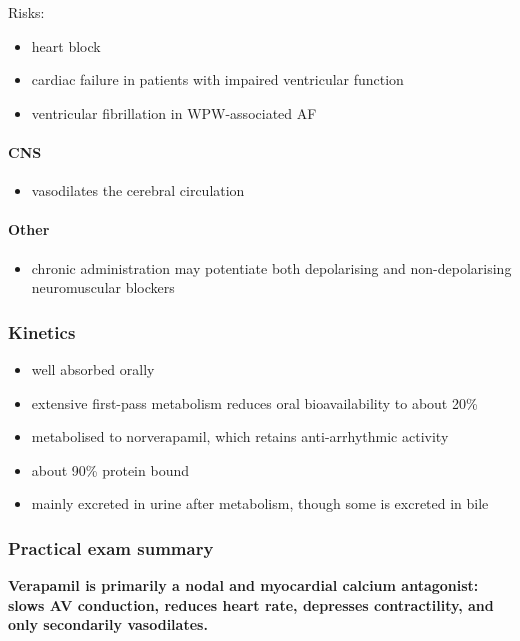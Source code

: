 \documentclass[11pt,a4paper]{article}
\begin{document}
Risks:
\begin{itemize}
    \item heart block
    \item cardiac failure in patients with impaired ventricular function
    \item ventricular fibrillation in WPW-associated AF
\end{itemize}

\paragraph{CNS}
\begin{itemize}
    \item vasodilates the cerebral circulation
\end{itemize}

\paragraph{Other}
\begin{itemize}
    \item chronic administration may potentiate both depolarising and non-depolarising neuromuscular blockers
\end{itemize}

\subsubsection*{Kinetics}
\begin{itemize}
    \item well absorbed orally
    \item extensive first-pass metabolism reduces oral bioavailability to about 20\%
    \item metabolised to norverapamil, which retains anti-arrhythmic activity
    \item about 90\% protein bound
    \item mainly excreted in urine after metabolism, though some is excreted in bile
\end{itemize}

\subsubsection*{Practical exam summary}

\textbf{Verapamil is primarily a nodal and myocardial calcium antagonist: slows AV conduction, reduces heart rate, depresses contractility, and only secondarily vasodilates.}
\end{document}
